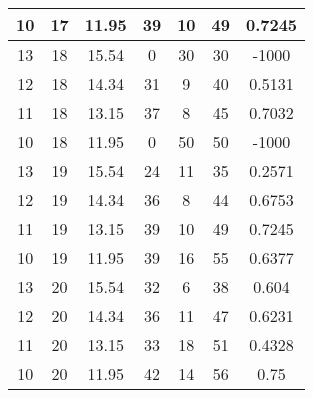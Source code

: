 \documentclass[letterpaper, 12pt]{article}
\begin{document}
\begin{longtable}{|c|c|c|c|c|c|c|}
\hline
10 & 17 & 11.95 & 39 & 10 & 49 & 0.7245 \\
\hline
13 & 18 & 15.54 & 0 & 30 & 30 & -1000 \\
\hline
12 & 18 & 14.34 & 31 & 9 & 40 & 0.5131 \\
\hline
11 & 18 & 13.15 & 37 & 8 & 45 & 0.7032 \\
\hline
10 & 18 & 11.95 & 0 & 50 & 50 & -1000 \\
\hline
13 & 19 & 15.54 & 24 & 11 & 35 & 0.2571 \\
\hline
12 & 19 & 14.34 & 36 & 8 & 44 & 0.6753 \\
\hline
11 & 19 & 13.15 & 39 & 10 & 49 & 0.7245 \\
\hline
10 & 19 & 11.95 & 39 & 16 & 55 & 0.6377 \\
\hline
13 & 20 & 15.54 & 32 & 6 & 38 & 0.604 \\
\hline
12 & 20 & 14.34 & 36 & 11 & 47 & 0.6231 \\
\hline
11 & 20 & 13.15 & 33 & 18 & 51 & 0.4328 \\
\hline
10 & 20 & 11.95 & 42 & 14 & 56 & 0.75 \\
\hline
\end{longtable}
\end{document}
